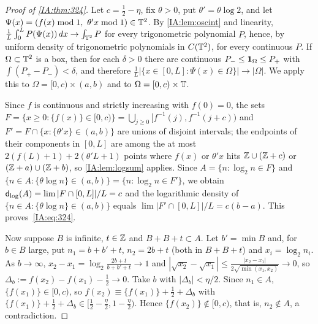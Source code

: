 \begin{proof}[Proof of \cref{IA:thm:324}]
Let $c=\frac12-\eta$, fix $\theta>0$, put $\theta'=\theta\log2$, and let
$\Psi(x)=(f(x)\bmod1,\ \theta'x\bmod1)\in\T^2$. By \cref{IA:lem:oscint} and linearity,
$\frac1L\int_0^LP(\Psi(x))\,dx\to\int_{\mathbb{T}^2}P$ for every trigonometric polynomial $P$, hence, by
uniform density of trigonometric polynomials in $C(\mathbb{T}^2)$, for every continuous $P$. If
$\Omega\subset\mathbb{T}^2$ is a box, then for each $\delta>0$ there are continuous $P_-\le\mathbf{1}_\Omega\le P_+$
with $\int(P_+-P_-)<\delta$, and therefore $\frac1L|\{x\in[0,L]:\Psi(x)\in\Omega\}|\to|\Omega|$. We
apply this to $\Omega=[0,c)\times(a,b)$ and to $\Omega=[0,c)\times\mathbb{T}$.

Since $f$ is continuous and strictly increasing with $f(0)=0$, the sets
$F=\{x\ge0:\{f(x)\}\in[0,c)\}=\bigcup_{j\ge0}[f^{-1}(j),f^{-1}(j+c))$ and
$F'=F\cap\{x:\{\theta'x\}\in(a,b)\}$ are unions of disjoint intervals; the endpoints of their
components in $[0,L]$ are among the at most $2(f(L)+1)+2(\theta'L+1)$ points where $f(x)$ or
$\theta'x$ hits $\mathbb{Z}\cup(\mathbb{Z}+c)$ or $(\mathbb{Z}+a)\cup(\mathbb{Z}+b)$, so \cref{IA:lem:logsum} applies. Since
$A=\{n:\log_2n\in F\}$ and $\{n\in A:\{\theta\log n\}\in(a,b)\}=\{n:\log_2n\in F'\}$, we obtain
$\mathsf{d}_{\log}(A)=\lim|F\cap[0,L]|/L=c$ and the logarithmic density of $\{n\in A:\{\theta\log n\}\in(a,b)\}$
equals $\lim|F'\cap[0,L]|/L=c(b-a)$. This proves~\eqref{IA:eq:324}.

Now suppose $B$ is infinite, $t\in\mathbb{Z}$ and $B+B+t\subset A$. Let $b'=\min B$ and, for $b\in B$ large,
put $n_1=b+b'+t$, $n_2=2b+t$ (both in $B+B+t$) and $x_i=\log_2n_i$. As $b\to\infty$,
$x_2-x_1=\log_2\frac{2b+t}{b+b'+t}\to1$ and $|\sqrt{x_2}-\sqrt{x_1}|\le\frac{|x_2-x_1|}{2\sqrt{\min(x_1,x_2)}}
\to0$, so $\Delta_b:=f(x_2)-f(x_1)-\frac12\to0$. Take $b$ with $|\Delta_b|<\eta/2$. Since $n_1\in A$,
$\{f(x_1)\}\in[0,c)$, so $f(x_2)\equiv\{f(x_1)\}+\frac12+\Delta_b$ with
$\{f(x_1)\}+\frac12+\Delta_b\in[\frac12-\frac\eta2,1-\frac\eta2)$. Hence
$\{f(x_2)\}\notin[0,c)$, that is, $n_2\notin A$, a contradiction.
\end{proof}



